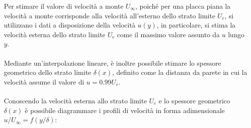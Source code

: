 \noindent Per stimare il valore di velocità a monte $U_\infty$, poiché per una placca piana la velocità a monte corrisponde alla velocità all'esterno dello strato limite $U_e$, si utilizzano i dati a disposizione della velocità $u(y)$, in particolare, si stima la velocità esterna dello strato limite $U_e$ come il massimo valore assunto da $u$ lungo $y$.\\\\
Mediante un'interpolazione lineare, è inoltre possibile stimare lo spessore geometrico dello strato limite $\delta(x)$, definito come la distanza da parete in cui la velocità assume il valore di $u=0.99U_e$.\\\\
Conoscendo la velocità esterna allo strato limite $U_e$ e lo spessore geometrico $\delta(x)$ è possibile diagrammare i profili di velocità in forma adimensionale $u/U_\infty=f(y/\delta)$:
